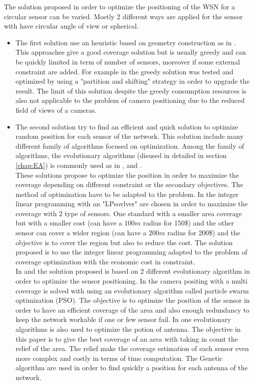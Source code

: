 The solution proposed in order to optimize the positioning of the WSN for a circular sensor can be varied. Mostly 2 different ways are applied for the sensor with have circular angle of view or spherical.\\

\begin{itemize}



\item	The first solution use an heuristic based on geometry construction as in \cite{175*medhi2013}. This approaches give a good coverage solution but is usually greedy and can be quickly limited in term of number of sensors, moreover if some external constraint are added.  For example in \cite{174*zhang2016} the greedy solution was tested and optimized by using a "partition and shifting" strategy in order to upgrade the result.
The limit of this solution despite the greedy consumption resources is also not applicable to the problem of camera positioning due to the reduced field of views of a cameras.  \\
\item	The second solution try to find an efficient and quick solution to optimize  random position for each sensor of the network.  
This solution include many different family of algorithms focused on optimization.
Among the family of algorithms,  the evolutionary algorithms (disused in detailed in section  \ref{chap:EA}) is commonly used as in \cite{200*kulkarni2011,59*wang2008}, and \cite{150*chakrabarty2002}. \\
These solutions  propose to optimize the position in order to maximize the coverage depending on different constraint or the secondary objectives. The method of optimization have to be adapted to the problem. 
In  \cite{150*chakrabarty2002} the integer linear programming with an "LPsovlver" are chosen in order to maximize the coverage with 2 type of sensors. One standard with a smaller area coverage but with a smaller cost (can have a $100m$ radius for 150\$) and the other sensor can cover a wider region (can have a $200m$  radius for 200\$) and the objective is to cover the region but also to reduce the cost. The solution proposed is to use the integer linear programming adapted to the problem of coverage optimization with the economic cost in constraint. \\
In \cite{59*wang2008} and \cite{200*kulkarni2011} the solution proposed is based on 2 different evolutionary algorithm in order to optimize the sensor positioning. In \cite{200*kulkarni2011} the camera positing with a multi coverage is solved with using an evolutionary algorithm called particle swarm optimization (PSO). The objective is to optimize the position of the sensor in order to have an efficient coverage of the area and also enough redundancy to keep the network workable if one or few sensor fail. In \cite{59*wang2008} one evolutionary algorithms is also used to optimize the potion of antenna. The objective in this paper is to give the best coverage of an area with taking in count the relief of the area. The relief make the coverage estimation of each sensor even more complex and costly in terms of time computation. The Genetic algorithm are used in order to find quickly a position for each antenna of the network. 

\end{itemize}

